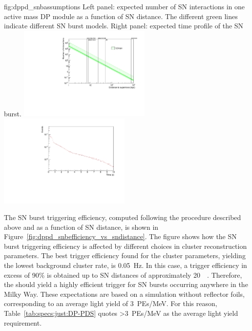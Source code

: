 \begin{dunefigure}{fig:dppd_snbassumptions}
     {Left panel: expected number of SN \nue {} interactions in one \dpactivelarmass active mass DP module as a function of SN distance. The different green lines indicate different SN burst models. Right panel: expected time profile of the SN burst.}
    \includegraphics[width=0.49\textwidth]{graphics/dppd_events_vs_sndistance.pdf} \hfill
    \includegraphics[width=0.49\textwidth]{graphics/dppd_sntime_profile.pdf} 
    \end{dunefigure}

The SN burst triggering efficiency, computed following the procedure described above and as a function of SN distance, is shown in Figure~\ref{fig:dppd_snbefficiency_vs_sndistance}. The figure shows how the SN burst triggering efficiency is affected by different choices in cluster reconstruction parameters. The best trigger efficiency found for the cluster parameters, yielding the lowest background cluster rate, is \SI{0.05}{\Hz}. In this case, a trigger efficiency in excess of \num{90}\% is obtained up to SN distances of approximately \SI{20}{\kilo\parsec}. Therefore, the  should yield a highly efficient trigger for SN bursts occurring anywhere in the Milky Way. These expectations are based on a  simulation without  reflector foils, corresponding to an average light yield of \SI{3}{PEs/\MeV}. For this reason, Table~\ref{tab:specs:just:DP-PDS} quotes \SI{>3}{PEs/\MeV} as the average light yield requirement.

